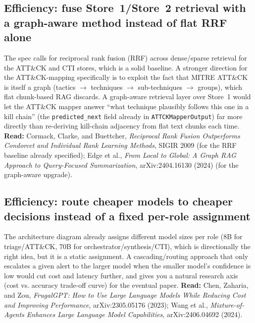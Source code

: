 \documentclass[11pt]{article}
\begin{document}
\subsection{Efficiency: fuse Store~1/Store~2 retrieval with a graph-aware method instead of flat RRF alone}
The spec calls for reciprocal rank fusion (RRF) across dense/sparse retrieval for the ATT\&CK and CTI stores, which is a solid baseline. A stronger direction for the ATT\&CK-mapping specifically is to exploit the fact that MITRE ATT\&CK is itself a graph (tactics $\to$ techniques $\to$ sub-techniques $\to$ groups), which flat chunk-based RAG discards. A graph-aware retrieval layer over Store~1 would let the ATT\&CK mapper answer ``what technique plausibly follows this one in a kill chain'' (the \texttt{predicted\_next} field already in \texttt{ATTCKMapperOutput}) far more directly than re-deriving kill-chain adjacency from flat text chunks each time. \textbf{Read:} Cormack, Clarke, and Buettcher, \emph{Reciprocal Rank Fusion Outperforms Condorcet and Individual Rank Learning Methods}, SIGIR 2009 (for the RRF baseline already specified); Edge et al., \emph{From Local to Global: A Graph RAG Approach to Query-Focused Summarization}, arXiv:2404.16130 (2024) (for the graph-aware upgrade).

\subsection{Efficiency: route cheaper models to cheaper decisions instead of a fixed per-role assignment}
The architecture diagram already assigns different model sizes per role (8B for triage/ATT\&CK, 70B for orchestrator/synthesis/CTI), which is directionally the right idea, but it is a static assignment. A cascading/routing approach that only escalates a given alert to the larger model when the smaller model's confidence is low would cut cost and latency further, and gives you a natural research axis (cost vs. accuracy trade-off curve) for the eventual paper. \textbf{Read:} Chen, Zaharia, and Zou, \emph{FrugalGPT: How to Use Large Language Models While Reducing Cost and Improving Performance}, arXiv:2305.05176 (2023); Wang et al., \emph{Mixture-of-Agents Enhances Large Language Model Capabilities}, arXiv:2406.04692 (2024).
\end{document}
